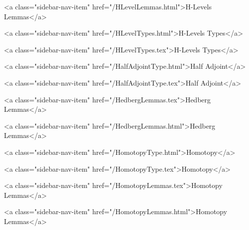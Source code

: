       
        
          <a class="sidebar-nav-item" href="/HLevelLemmas.html">H-Levels Lemmas</a>
        
      
    
      
        
          <a class="sidebar-nav-item" href="/HLevelTypes.html">H-Levels Types</a>
        
      
    
      
        
          <a class="sidebar-nav-item" href="/HLevelTypes.tex">H-Levels Types</a>
        
      
    
      
        
          <a class="sidebar-nav-item" href="/HalfAdjointType.html">Half Adjoint</a>
        
      
    
      
        
          <a class="sidebar-nav-item" href="/HalfAdjointType.tex">Half Adjoint</a>
        
      
    
      
        
          <a class="sidebar-nav-item" href="/HedbergLemmas.tex">Hedberg Lemmas</a>
        
      
    
      
        
          <a class="sidebar-nav-item" href="/HedbergLemmas.html">Hedberg Lemmas</a>
        
      
    
      
        
          <a class="sidebar-nav-item" href="/HomotopyType.html">Homotopy</a>
        
      
    
      
        
          <a class="sidebar-nav-item" href="/HomotopyType.tex">Homotopy</a>
        
      
    
      
        
          <a class="sidebar-nav-item" href="/HomotopyLemmas.tex">Homotopy Lemmas</a>
        
      
    
      
        
          <a class="sidebar-nav-item" href="/HomotopyLemmas.html">Homotopy Lemmas</a>
        
      
    

